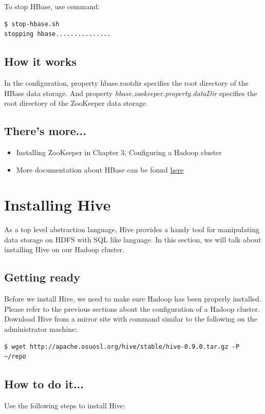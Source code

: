 To stop HBase, use command:
\begin{verbatim}
$ stop-hbase.sh
stopping hbase...............
\end{verbatim}

\subsection*{How it works}
In the configuration, property hbase.rootdir specifies the root directory of the HBase data storage. And property \emph{hbase.zookeeper.property.dataDir} specifies the root directory of the ZooKeeper data storage.

\subsection*{There's more...}
\begin{itemize}
  \item Installing ZooKeeper in Chapter 3, Configuring a Hadoop cluster
  \item More documentation about HBase can be found \href{http://wiki.apache.org/hadoop/Hbase}{here}
\end{itemize}

\section{Installing Hive}
As a top level abstraction language, Hive provides a handy tool for manipulating data storage on HDFS with SQL like language. In this section, we will talk about installing Hive on our Hadoop cluster.

\subsection*{Getting ready}
Before we install Hive, we need to make sure Hadoop has been properly installed. Please refer to the previous sections about the configuration of a Hadoop cluster. \\
Download Hive from a mirror site with command similar to the following on the administrator machine:
\lstset{style=bashstyle}
\begin{lstlisting}
$ wget http://apache.osuosl.org/hive/stable/hive-0.9.0.tar.gz -P ~/repo
\end{lstlisting}

\subsection*{How to do it...}
Use the following steps to install Hive:

